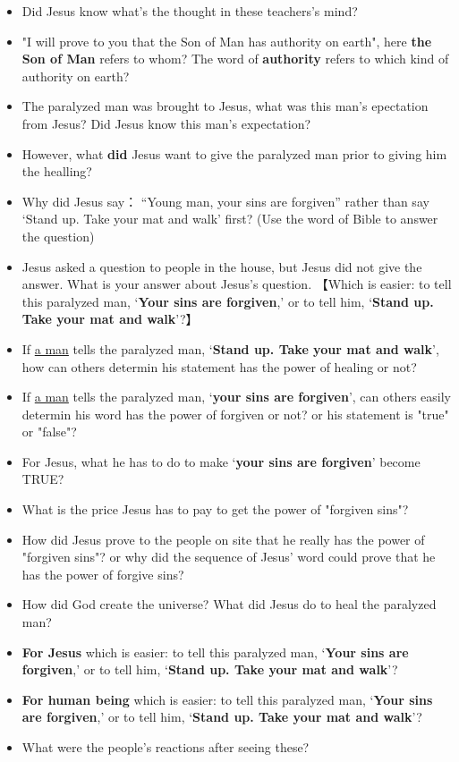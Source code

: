 \begin{itemize}[noitemsep]
\item Did Jesus know what's the thought in these teachers's mind?
\item "I will prove to you that the Son of Man has authority on earth", here \textbf{the Son of Man} refers to whom? The word of \textbf{authority} refers to which kind of authority on earth?
\item The paralyzed man was brought to Jesus, what was this man's epectation from Jesus? Did Jesus know this man's expectation?
\item However, what \textbf{did} Jesus want to give the paralyzed man prior to giving him the healling?
\item Why did Jesus say： “Young man, your sins are forgiven” rather than say ‘Stand up. Take your mat and walk’ first? (Use the word of Bible to answer the question)
\item Jesus asked a question to people in the house, but Jesus did not give the answer. What is your answer about Jesus's question. 【Which is easier: to tell this paralyzed man, ‘\textbf{Your sins are forgiven},’ or to tell him, ‘\textbf{Stand up. Take your mat and walk}’?】
\item If \underline{a man} tells the paralyzed man, ‘\textbf{Stand up. Take your mat and walk}’, how can others determin his statement has the power of healing or not?
\item If \underline{a man} tells the paralyzed man, ‘\textbf{your sins are forgiven}’, can others easily determin his word has the power of forgiven or not? or his statement is "true" or "false"?
\item For Jesus, what he has to do to make ‘\textbf{your sins are forgiven}’ become TRUE?
\item What is the price Jesus has to pay to get the power of "forgiven sins"?
\item How did Jesus prove to the people on site that he really has the power of  "forgiven sins"? or why did the sequence of Jesus' word could prove that he has the power of forgive sins?
\item How did God create the universe? What did Jesus do to heal the paralyzed man?
\item \textbf{For Jesus} which is easier: to tell this paralyzed man, ‘\textbf{Your sins are forgiven},’ or to tell him, ‘\textbf{Stand up. Take your mat and walk}’?
\item \textbf{For human being} which is easier: to tell this paralyzed man, ‘\textbf{Your sins are forgiven},’ or to tell him, ‘\textbf{Stand up. Take your mat and walk}’?
\item What were the people's reactions after seeing these?
\end{itemize}















